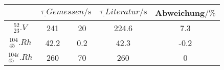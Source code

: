 \label{tab:tabFehler}
	\begin{tabular}{cc @{${}\pm{}$} ccS[table-format=1.1]}
		\toprule
		{} &   & {$\tau_.{Literatur}/\si{\second}$} & {Abweichung$/\% $}\\
		\midrule
		$^{52}_{23}.V$		& 241	& 20	& 224.6	& 7.3 \\
		$^{104}_{45}.{Rh}$	& 42.2	& 0.2	& 42.3	& -0.2 \\
		$^{104i}_{45}.{Rh}$	& 260 	& 70	& 260	& 0 \\
		\bottomrule
	\end{tabular}
